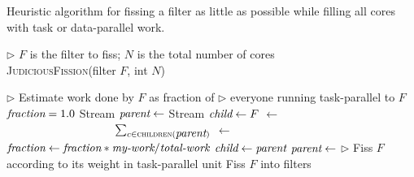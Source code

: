 \begin{algorithm}[t]
\caption{Heuristic algorithm for fissing a filter as little as
possible while filling all cores with task or data-parallel
work. \label{fig:judicious-fission}}
{$\triangleright$ $F$ is the filter to fiss; $N$ is the total number of cores\\
\textsc{JudiciousFission}(filter $F$, int $N$)}
\begin{algorithmic}
\Statex $\triangleright$ Estimate work done by $F$ as fraction of
\Statex $\triangleright$ everyone running task-parallel to $F$
\State $\mbox{\it fraction} = 1.0$
\State Stream $\mbox{\it parent} \gets$ 
\State Stream $\mbox{\it child}  \gets F$
		\State {} $\gets$ \\
\ \ \ \ \ \ \ \ \ \ \ \ \ \  \ \ \ \ \  $\sum_{c \in \textsc{children}(\mbox{\it parent})}$ 
		\State {} $ \gets $ 
		\State $\mbox{\it fraction} \gets \mbox{\it fraction} * \mbox{\it my-work} /
\mbox{\it total-work}$
	\EndIf
	\State $\mbox{\it child} \gets \mbox{\it parent}$
	\State $\mbox{\it parent} \gets $ 
\EndWhile
\Statex $\triangleright$ Fiss $F$ according to its weight in task-parallel unit
\State Fiss $F$ into  filters
\end{algorithmic}
\end{algorithm}


